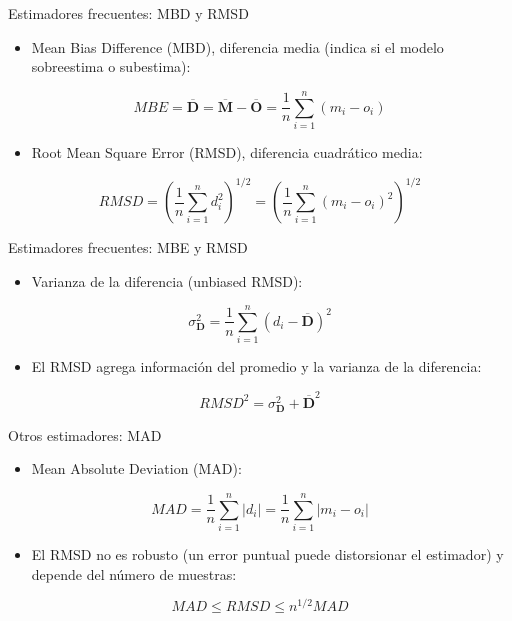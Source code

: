 \documentclass[xcolor={usenames,svgnames,dvipsnames}]{beamer}
\begin{document}
\begin{frame}[label={sec:org0d5e175}]{Estimadores frecuentes: MBD y RMSD}
\begin{itemize}
\item Mean Bias Difference (MBD), diferencia media (indica si el modelo sobreestima o subestima):
\end{itemize}
\[
MBE = \overline{\mathbf{D}} = \overline{\mathbf{M}} - \overline{\mathbf{O}} = \frac{1}{n} \sum_{i=1}^n (m_i - o_i)
\]
\pause
\begin{itemize}
\item Root Mean Square Error (RMSD), diferencia cuadrático media:
\end{itemize}
\[
RMSD = \left(\frac{1}{n} \sum_{i=1}^n d_i^2 \right)^{1/2} =  \left( \frac{1}{n} \sum_{i=1}^n (m_i - o_i)^2  \right)^{1/2}
\]
\end{frame}

\begin{frame}[label={sec:org6ceac56}]{Estimadores frecuentes: MBE y RMSD}
\begin{itemize}
\item Varianza de la diferencia (unbiased RMSD):
\end{itemize}
\[
\sigma^2_{\mathbf{D}} = \frac{1}{n} \sum_{i=1}^n (d_i - \overline{\mathbf{D}})^2
\]
\pause

\begin{itemize}
\item El RMSD agrega información del promedio y la varianza de la
diferencia:
\end{itemize}
\[
RMSD^2= \sigma^2_{\mathbf{D}} + \overline{\mathbf{D}}^2
\]
\end{frame}

\begin{frame}[label={sec:org7ab3fd7}]{Otros estimadores: MAD}
\begin{itemize}
\item Mean Absolute Deviation (MAD):
\end{itemize}

\[
MAD = \frac{1}{n} \sum_{i=1}^n \left|d_i\right| =  \frac{1}{n} \sum_{i=1}^n \left|m_i - o_i\right|
\]
\begin{itemize}
\item El RMSD no es robusto (un error puntual puede distorsionar el estimador) y depende del número de muestras:
\end{itemize}
\[
MAD \leq RMSD \leq n^{1/2} MAD
\]

\nocite{Willmott.Matsuura.ea2009, Willmott.Matsuura2005a}
\end{frame}
\end{document}
